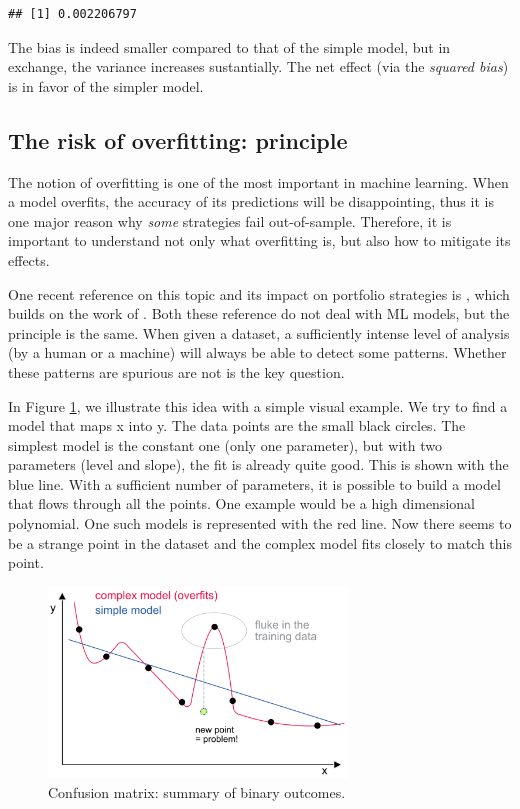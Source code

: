 \documentclass[]{krantz}
\theoremstyle{definition}
\theoremstyle{definition}
\theoremstyle{definition}
\theoremstyle{remark}
\begin{document}
\begin{verbatim}
## [1] 0.002206797
\end{verbatim}

\normalsize

The bias is indeed smaller compared to that of the simple model, but in
exchange, the variance increases sustantially. The net effect (via the
\emph{squared bias}) is in favor of the simpler model.

\hypertarget{the-risk-of-overfitting-principle}{%
\subsection{The risk of overfitting:
principle}\label{the-risk-of-overfitting-principle}}

The notion of overfitting is one of the most important in machine
learning. When a model overfits, the accuracy of its predictions will be
disappointing, thus it is one major reason why \emph{some} strategies
fail out-of-sample. Therefore, it is important to understand not only
what overfitting is, but also how to mitigate its effects.

One recent reference on this topic and its impact on portfolio
strategies is \citet{hsu2018asset}, which builds on the work of
\citet{white2000reality}. Both these reference do not deal with ML
models, but the principle is the same. When given a dataset, a
sufficiently intense level of analysis (by a human or a machine) will
always be able to detect some patterns. Whether these patterns are
spurious are not is the key question.

In Figure \ref{fig:overfit}, we illustrate this idea with a simple
visual example. We try to find a model that maps x into y. The data
points are the small black circles. The simplest model is the constant
one (only one parameter), but with two parameters (level and slope), the
fit is already quite good. This is shown with the blue line. With a
sufficient number of parameters, it is possible to build a model that
flows through all the points. One example would be a high dimensional
polynomial. One such models is represented with the red line. Now there
seems to be a strange point in the dataset and the complex model fits
closely to match this point.

\begin{figure}[H]

{\centering \includegraphics[width=300px]{images/overfitting} 

}

\caption{Confusion matrix: summary of binary outcomes.}\label{fig:overfit}
\end{figure}
\end{document}
